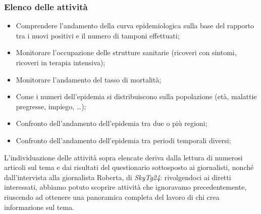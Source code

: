 \subsubsection{Elenco delle attività}
\begin{itemize}
    \item Comprendere l'andamento della curva epidemiologica sulla base del rapporto tra i nuovi positivi e il numero di tamponi effettuati;
    \item Monitorare l'occupazione delle strutture sanitarie (ricoveri con sintomi, ricoveri in terapia intensiva);
    \item Monitorare l'andamento del tasso di mortalità;
    \item Come i numeri dell'epidemia si distribuiscono sulla popolazione (età, malattie pregresse, impiego, …);
    \item Confronto dell'andamento dell'epidemia tra due o più regioni;
    \item Confronto dell'andamento dell'epidemia tra periodi temporali diversi;
\end{itemize}

L'individuazione delle attività sopra elencate deriva dalla lettura di numerosi articoli sul tema e dai risultati del questionario sottosposto ai giornalisti, nonché dall'intervista alla giornalista Roberta, di \textit{SkyTg24}: rivolgendoci ai diretti interessati, abbiamo potuto scoprire attività che ignoravamo precedentemente, riuscendo ad ottenere una panoramica completa del lavoro di chi crea informazione sul tema.


